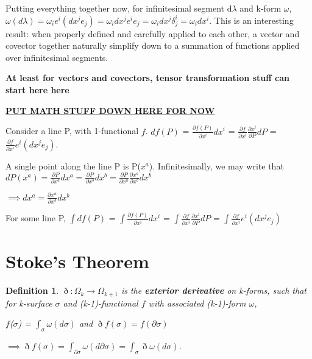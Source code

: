 \documentclass{book}
\newtheorem{defn}[equation]{Definition}
\begin{document}
Putting everything together now, for infinitesimal segment d$\lambda$ and k-form $\omega$, $\omega(d\lambda) = \omega_ie^i(dx^je_j) = \omega_idx^je^ie_j = \omega_idx^j\delta^i_j = \omega_i dx^i$. This is an interesting result: when properly defined and carefully applied to each other, a vector and covector together naturally simplify down to a summation of functions applied over infinitesimal segments. 

\textbf{At least for vectors and covectors, tensor transformation stuff can start here here}


\underline{\textbf{PUT MATH STUFF DOWN HERE FOR NOW}}

Consider a line P, with 1-functional $f$. $ df(P)$ = $ \frac{\partial f(P)}{{\partial x^i}} dx^i$ = $ \frac{\partial f}{\partial x^i}\frac{\partial x^i}{\partial P}dP$ = $\frac{{\partial f}}{{\partial x^i}} e^i (dx^j e_j)$. 

A single point along the line P is P($x^a$). Infinitesimally, we may write that  
$dP(x^a) = \frac{\partial P}{\partial x^a} dx^a = \frac{\partial P}{\partial x^b} dx^b = \frac{\partial P}{\partial x^a}\frac{\partial x^a}{\partial x^b} dx^b$

$\implies dx^a = \frac{\partial x^a}{\partial x^b}dx^b $

For some line P, $\int df(P)$ = $\int \frac{\partial f(P)}{{\partial x^i}} dx^i$ = $\int \frac{\partial f}{\partial x^i}\frac{\partial x^i}{\partial P}dP$ = $\int \frac{{\partial f}}{{\partial x^i}} e^i (dx^j e_j)$
\section{Stoke's Theorem}



\begin{defn}
	$\eth : \Omega_k \to \Omega_{k+1}$ is the \textbf{exterior derivative} on k-forms, such that for k-surface $\sigma$ and (k-1)-functional $f$ with associated (k-1)-form $\omega$, 
	
	$f$($\sigma$) = $\int_{\sigma}\omega(d\sigma)$ and $\eth f(\sigma) = f(\partial\sigma)$
	
	$\implies \eth f(\sigma) = \int_{\partial\sigma} \omega(d\partial\sigma) = \int_{\sigma} \eth\omega(d\sigma)$. 
\end{defn}




 

\end{document}
